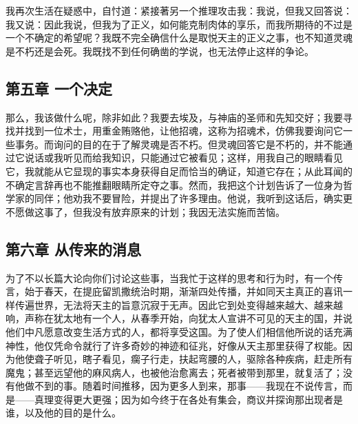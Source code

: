 我再次生活在疑惑中，自忖道：紧接著另一个推理攻击我：我说，但我又回答说：我又说：因此我说，但我为了正义，如何能克制肉体的享乐，而我所期待的不过是一个不确定的希望呢？我既不完全确信什么是取悦天主的正义之事，也不知道灵魂是不朽还是会死。我既找不到任何确凿的学说，也无法停止这样的争论。\par


\subsection{第五章 一个决定}

那么，我该做什么呢，除非如此？我要去埃及，与神庙的圣师和先知交好；我要寻找并找到一位术士，用重金贿赂他，让他招魂，这称为招魂术，仿佛我要询问它一些事务。而询问的目的在于了解灵魂是否不朽。但灵魂回答它是不朽的，并不能通过它说话或我听见而给我知识，只能通过它被看见；这样，用我自己的眼睛看见它，我就能从它显现的事实本身获得自足而恰当的确证，知道它存在；从此耳闻的不确定言辞再也不能推翻眼睛所定夺之事。然而，我把这个计划告诉了一位身为哲学家的同伴；他劝我不要冒险，并提出了许多理由。他说，我听到这话后，确实更不愿做这事了，但我没有放弃原来的计划；我因无法实施而苦恼。\par


\subsection{第六章 从传来的消息}

为了不以长篇大论向你们讨论这些事，当我忙于这样的思考和行为时，有一个传言，始于春天，在提庇留凯撒统治时期，渐渐四处传播，并如同天主真正的喜讯一样传遍世界，无法将天主的旨意沉寂于无声。因此它到处变得越来越大、越来越响，声称在犹太地有一个人，从春季开始，向犹太人宣讲不可见的天主的国，并说他们中凡愿意改变生活方式的人，都将享受这国。为了使人们相信他所说的话充满神性，他仅凭命令就行了许多奇妙的神迹和征兆，好像从天主那里获得了权能。因为他使聋子听见，瞎子看见，瘸子行走，扶起弯腰的人，驱除各种疾病，赶走所有魔鬼；甚至远望他的麻风病人，也被他治愈离去；死者被带到那里，就复活了；没有他做不到的事。随着时间推移，因为更多人到来，那事——我现在不说传言，而是——真理变得更大更强；因为如今终于在各处有集会，商议并探询那出现者是谁，以及他的目的是什么。\par

